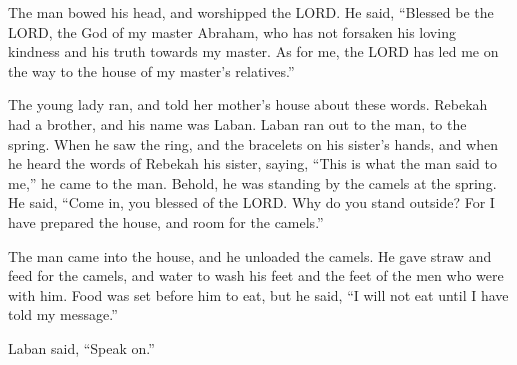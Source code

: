  The man bowed his head, and worshipped the LORD.
 He said, ``Blessed be the LORD, the God of my master
Abraham, who has not forsaken his loving kindness and his truth towards
my master. As for me, the LORD has led me on the way to the house of my
master's relatives.''

 The young lady ran, and told her mother's house about
these words.  Rebekah had a brother, and his name was
Laban. Laban ran out to the man, to the spring.  When he
saw the ring, and the bracelets on his sister's hands, and when he heard
the words of Rebekah his sister, saying, ``This is what the man said to
me,'' he came to the man. Behold, he was standing by the camels at the
spring.  He said, ``Come in, you blessed of the LORD. Why
do you stand outside? For I have prepared the house, and room for the
camels.''

 The man came into the house, and he unloaded the camels.
He gave straw and feed for the camels, and water to wash his feet and
the feet of the men who were with him.  Food was set before
him to eat, but he said, ``I will not eat until I have told my
message.''

Laban said, ``Speak on.''

